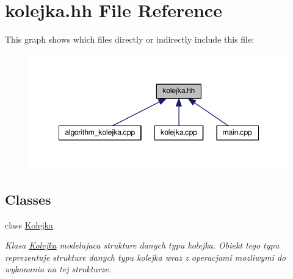 \hypertarget{kolejka_8hh}{\section{kolejka.\-hh File Reference}
\label{kolejka_8hh}
}
This graph shows which files directly or indirectly include this file\-:\nopagebreak
\begin{figure}[H]
\begin{center}
\leavevmode
\includegraphics[width=348pt]{kolejka_8hh__dep__incl}
\end{center}
\end{figure}
\subsection*{Classes}
\begin{DoxyCompactItemize}
\item 
class \hyperlink{class_kolejka}{Kolejka}
\begin{DoxyCompactList}\small\item\em Klasa \hyperlink{class_kolejka}{Kolejka} modelujaca strukture danych typu kolejka. Obiekt tego typu reprezentuje strukture danych typu kolejka wraz z operacjami mozliwymi do wykonania na tej strukturze. \end{DoxyCompactList}\end{DoxyCompactItemize}
